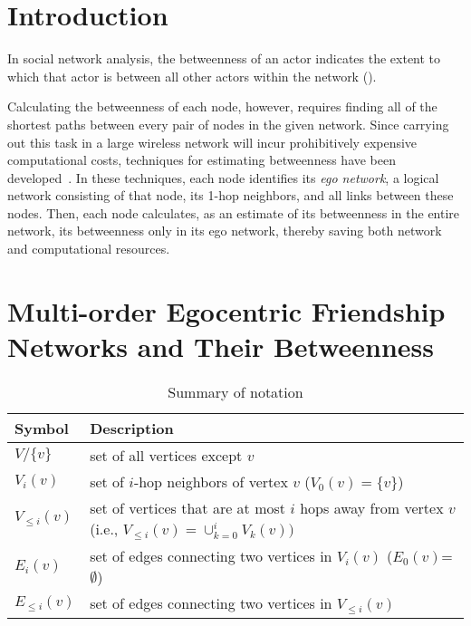 \documentclass[preprint,12pt,authoryear]{elsarticle}
\newcommand{\V}[2]{V_{#2}({#1})}
\newcommand{\LV}[2]{V_{\le #2}({#1})}
\newcommand{\E}[2]{E_{#2}({#1})}
\newcommand{\LE}[2]{E_{\le #2}({#1})}
\theoremstyle{definition}
\begin{document}

\section{Introduction}\label{sec:introduction}

In social network analysis, the betweenness of an actor indicates the extent to which that actor is between all other actors within the network (\cite{centrality}).

Calculating the betweenness of each node, however, requires finding all of the shortest paths between every pair of nodes in the given network.
Since carrying out this task in a large wireless network will incur prohibitively expensive computational costs, techniques for estimating betweenness have been developed~\cite{SIMBET,egocentric,everett,ICCN:lbcdna,Pant13:Local}.
In these techniques, each node identifies its \emph{ego network}, a logical network consisting of that node, its 1-hop neighbors, and all links between these nodes.
Then, each node calculates, as an estimate of its betweenness in the entire network, its betweenness only in its ego network, thereby saving both network and computational resources.


\section{Multi-order Egocentric Friendship Networks and Their Betweenness}\label{sec:multi-order-friendship-network}

\begin{table}[t]
\captionsetup[subfigure]{aboveskip=-2pt, belowskip=-1pt}
\center
\caption{Summary of notation}\label{table:symbols}
\small
    \begin{tabular}{| p{1.2cm} | p{10cm} |}
        \hline
        Symbol & Description \\
        \hline
        \hline
        $V/\{v\}$ & set of all vertices except $v$ \\        
        $\V{v}{i}$ & set of $i$-hop neighbors of vertex $v$ ($\V{v}{0} = \{ v \}$)\\
        $\LV{v}{i}$ & set of vertices that are at most $i$ hops away from vertex $v$ (i.e., $\LV{v}{i} = \cup_{k = 0}^{i} \V{v}{k}) $\\
        $\E{v}{i}$ & set of edges connecting two vertices in $\V{v}{i}$ ($\E{v}{0}$=$\emptyset$)\\
        $\LE{v}{i}$ & set of edges connecting two vertices in $\LV{v}{i}$\\
        \hline
    \end{tabular}
\end{table}
\end{document}
